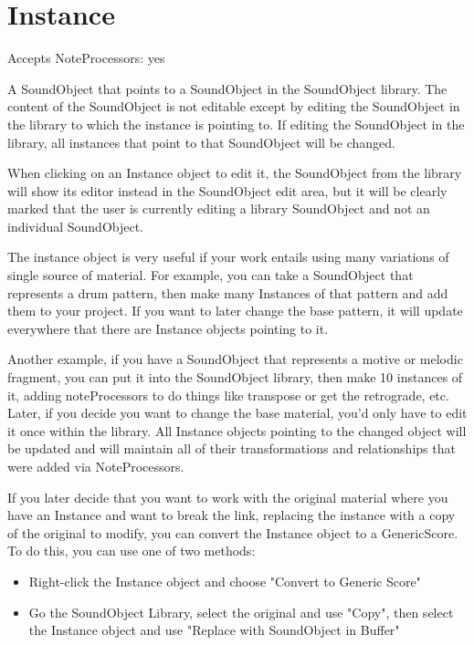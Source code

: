 \section{Instance}\label{instanceObject}

Accepts NoteProcessors: yes

A SoundObject that points to a SoundObject in the SoundObject library.
The content of the SoundObject is not editable except by editing the
SoundObject in the library to which the instance is pointing to. If
editing the SoundObject in the library, all instances that point to that
SoundObject will be changed.

When clicking on an Instance object to edit it, the SoundObject from the
library will show its editor instead in the SoundObject edit area, but
it will be clearly marked that the user is currently editing a library
SoundObject and not an individual SoundObject.

The instance object is very useful if your work entails using many
variations of single source of material. For example, you can take a
SoundObject that represents a drum pattern, then make many Instances of
that pattern and add them to your project. If you want to later change
the base pattern, it will update everywhere that there are Instance
objects pointing to it.

Another example, if you have a SoundObject that represents a motive or
melodic fragment, you can put it into the SoundObject library, then make
10 instances of it, adding noteProcessors to do things like transpose or
get the retrograde, etc. Later, if you decide you want to change the
base material, you'd only have to edit it once within the library. All
Instance objects pointing to the changed object will be updated and will
maintain all of their transformations and relationships that were added
via NoteProcessors.

If you later decide that you want to work with the original material
where you have an Instance and want to break the link, replacing the
instance with a copy of the original to modify, you can convert the
Instance object to a GenericScore. To do this, you can use one of two
methods:

\begin{itemize}
\tightlist
\item
  Right-click the Instance object and choose "Convert to Generic Score"
\item
  Go the SoundObject Library, select the original and use "Copy", then
  select the Instance object and use "Replace with SoundObject in
  Buffer"
\end{itemize}
